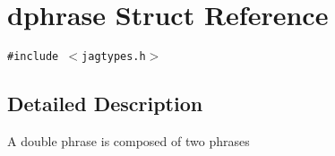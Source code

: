 \hypertarget{structdphrase}{
\section{dphrase Struct Reference}
\label{structdphrase}
}
{\tt \#include $<$jagtypes.h$>$}



\subsection{Detailed Description}
A double phrase is composed of two phrases 